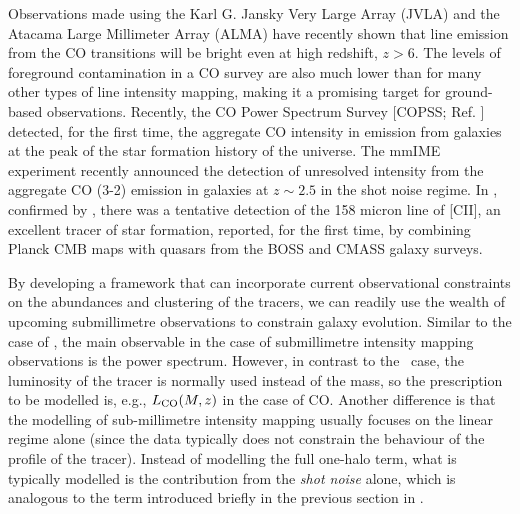 Observations made using the Karl G. Jansky Very Large Array (JVLA) and the Atacama Large Millimeter Array (ALMA) have recently shown that line emission from the CO transitions will be bright even at high redshift, $z > 6$.  The levels of foreground contamination in a CO survey are also much lower than for many other types of line intensity mapping, making it a promising target for ground-based observations. Recently, the CO Power Spectrum Survey [COPSS; Ref. \cite{keating2016}] detected, for the first time, the aggregate CO intensity in emission from galaxies at the peak of the star formation history of the universe. The mmIME experiment recently \cite{keating2020} announced the detection of unresolved intensity from the aggregate CO (3-2) emission in galaxies at $z \sim 2.5$ in the shot noise regime. In \cite{pullen2018}, confirmed by \cite{yang2019}, there was a tentative detection of the 158 micron line of [CII], an excellent tracer of star formation, reported, for the first time, by combining Planck CMB maps with  quasars from the BOSS and CMASS galaxy surveys.




By developing a framework that can incorporate current observational constraints on the abundances and clustering of the tracers, we can readily use the wealth of upcoming submillimetre observations to constrain galaxy evolution. Similar to the case of \HI, the main observable in the case of submillimetre intensity mapping observations is the power spectrum. However, in contrast to the \HI\ case, the luminosity of the tracer is normally used instead of the mass, so the prescription to be modelled is, e.g.,  $L_{\rm CO} (M,z)$ in the case of CO. Another difference is that the modelling of sub-millimetre intensity mapping usually focuses on the linear regime alone (since the data typically does not constrain the behaviour of the profile of the tracer). Instead of modelling the  full one-halo term, what is typically modelled is the contribution from the \textit{shot noise} alone, which is analogous to the term introduced briefly in the previous section in .



